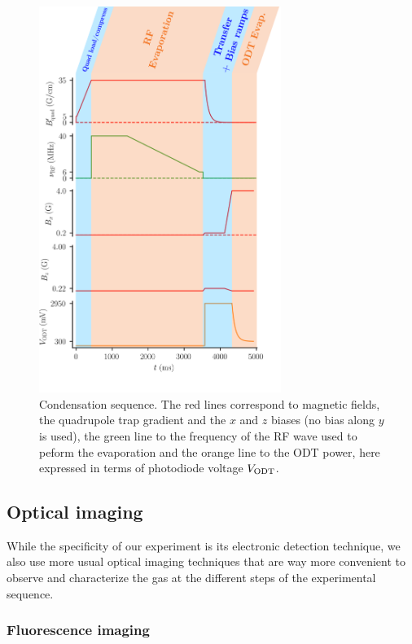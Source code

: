 \begin{figure}
    \centering
    \includegraphics[width=0.7\textwidth]{Fig/Chapter3/condensation_sequence.png}
    \caption[Condensation sequence]{Condensation sequence. The red lines correspond to magnetic fields, \ie the quadrupole trap gradient and the $x$ and $z$ biases (no bias along $y$ is used), the green line to the frequency of the RF wave used to peform the evaporation and the orange line to the ODT power, here expressed in terms of photodiode voltage $V_{\rm{ODT}}$.}
    \label{fig:my_label}
\end{figure}

\subsection{Optical imaging}

While the specificity of our experiment is its electronic detection technique, we also use more usual optical imaging techniques that are way more convenient to observe and characterize the gas at the different steps of the experimental sequence.

\subsubsection{Fluorescence imaging}

